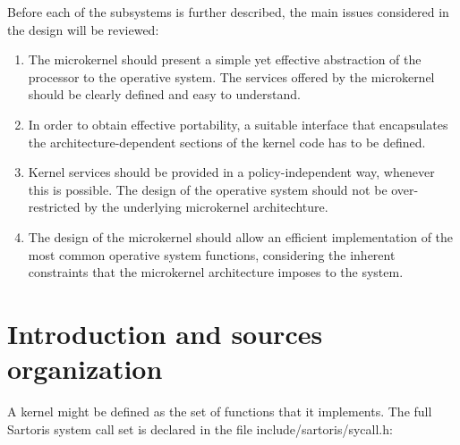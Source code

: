\documentclass[11pt, letterpaper, twoside, english]{book}
\begin{document}
\noindent{}Before each of the subsystems is further described, the main issues considered in the design will be reviewed:
\begin{enumerate}
\item[] The microkernel should present a simple yet effective abstraction of the processor to the operative system. The services offered by the microkernel should be clearly defined and easy to understand.
\item[] In order to obtain effective portability, a suitable interface that encapsulates the architecture-dependent sections of the kernel code has to be defined.
\item[] Kernel services should be provided in a policy-independent way, whenever this is possible. The design of the operative system should not be over-restricted by the underlying microkernel architechture.
\item[] The design of the microkernel should allow an efficient implementation of the most common operative system functions, considering the inherent constraints that the microkernel architecture imposes to the system.
\end{enumerate}

\section{Introduction and sources organization}
A kernel might be defined as the set of functions that it implements. The full Sartoris system call set is declared in the file \textsf{include/sartoris/sycall.h}:
\end{document}
